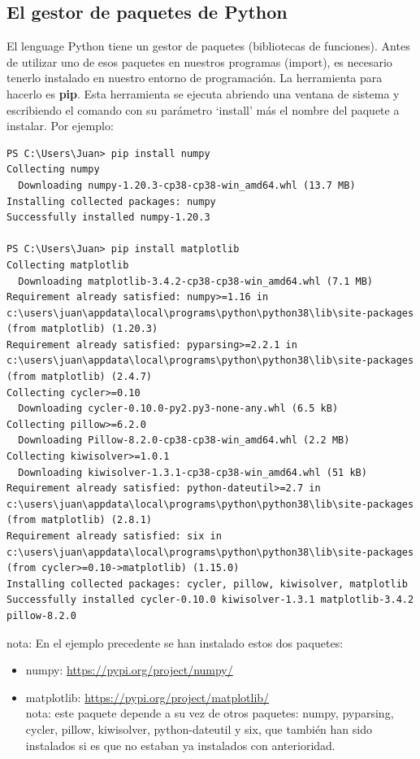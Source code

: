 \documentclass[spanish,12pt,a4paper,final,oneside]{book}
\begin{document}
\subsection{El gestor de paquetes de Python}

El lenguage Python tiene un gestor de paquetes (bibliotecas de funciones). Antes de utilizar uno de esos paquetes en nuestros programas (import), es necesario tenerlo instalado en nuestro entorno de programación. La herramienta para hacerlo es \textbf{pip}. Esta herramienta se ejecuta  abriendo una ventana de sistema y escribiendo el comando con su parámetro `install' más el nombre del paquete a instalar. Por ejemplo:
\begin{lstlisting}
PS C:\Users\Juan> pip install numpy
Collecting numpy
  Downloading numpy-1.20.3-cp38-cp38-win_amd64.whl (13.7 MB)
Installing collected packages: numpy
Successfully installed numpy-1.20.3

PS C:\Users\Juan> pip install matplotlib
Collecting matplotlib
  Downloading matplotlib-3.4.2-cp38-cp38-win_amd64.whl (7.1 MB)
Requirement already satisfied: numpy>=1.16 in c:\users\juan\appdata\local\programs\python\python38\lib\site-packages (from matplotlib) (1.20.3)
Requirement already satisfied: pyparsing>=2.2.1 in c:\users\juan\appdata\local\programs\python\python38\lib\site-packages (from matplotlib) (2.4.7)
Collecting cycler>=0.10
  Downloading cycler-0.10.0-py2.py3-none-any.whl (6.5 kB)
Collecting pillow>=6.2.0
  Downloading Pillow-8.2.0-cp38-cp38-win_amd64.whl (2.2 MB)
Collecting kiwisolver>=1.0.1
  Downloading kiwisolver-1.3.1-cp38-cp38-win_amd64.whl (51 kB)
Requirement already satisfied: python-dateutil>=2.7 in c:\users\juan\appdata\local\programs\python\python38\lib\site-packages (from matplotlib) (2.8.1)
Requirement already satisfied: six in c:\users\juan\appdata\local\programs\python\python38\lib\site-packages (from cycler>=0.10->matplotlib) (1.15.0)
Installing collected packages: cycler, pillow, kiwisolver, matplotlib
Successfully installed cycler-0.10.0 kiwisolver-1.3.1 matplotlib-3.4.2 pillow-8.2.0
\end{lstlisting}

nota: En el ejemplo precedente se han instalado estos dos paquetes:
\begin{itemize}
\item numpy: \url{https://pypi.org/project/numpy/}
\item matplotlib: \url{https://pypi.org/project/matplotlib/}
\\{\footnotesize nota: este paquete depende a su vez de otros paquetes: numpy, pyparsing, cycler, pillow, kiwisolver, python-dateutil y six, que también han sido instalados si es que no estaban ya instalados con anterioridad.}
\end{itemize}
\end{document}
